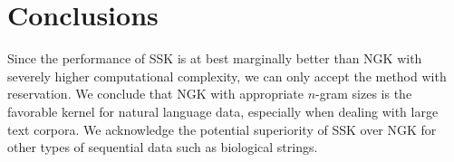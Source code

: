 \section{Conclusions} \label{sec:conclusions}

Since the performance of SSK is at best marginally better than NGK with severely higher computational complexity, we can only accept the method with reservation. We conclude that NGK with appropriate $n$-gram sizes is the favorable kernel for natural language data, especially when dealing with large text corpora. We acknowledge the potential superiority of SSK over NGK for other types of sequential data such as biological strings.

